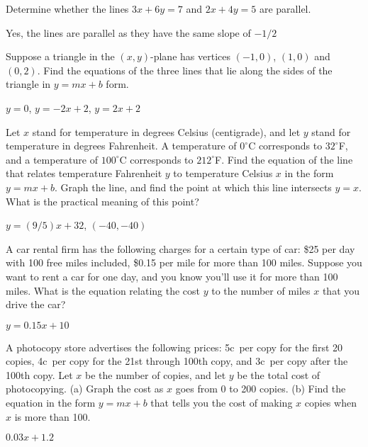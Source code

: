 \begin{enumialphparenastyle}
\begin{multicols}{2}
\begin{ex}
Determine whether the lines $3x+6y=7$ and $2x+4y=5$ are parallel.
\begin{sol}
Yes, the lines are parallel as they have the same slope of $-1/2$
\end{sol}
\end{ex}

\begin{ex}
Suppose a triangle in the $(x,y)$-plane has vertices $(-1,0)$,
$(1,0)$ and $(0,2)$.  Find the equations of the three lines that lie along
 the sides of the triangle in $y=mx+b$ form.
\begin{sol}
$y=0$, $y=-2x+2$, $y=2x+2$
\end{sol}
\end{ex}

\begin{ex}
Let $x$ stand for temperature in degrees Celsius (centigrade), and let
$y$ stand for temperature in degrees Fahrenheit.  A temperature of $0^\circ$C
corresponds to $32^\circ$F, and a temperature of
$100^\circ$C corresponds to $212^\circ$F.  Find the
equation of the line that relates temperature Fahrenheit $y$ to
temperature Celsius $x$ in the form $y=mx+b$.  
Graph the line, and find the point at which this line intersects $y=x$.
What is the practical meaning of this point?
\begin{sol}
$y=(9/5)x+32$, $(-40,-40)$
\end{sol}
\end{ex}

\begin{ex}
A car rental firm has the following charges for a certain type of car:
\$25 per day with 100 free miles included, \$0.15 per mile for more than
100 miles.  Suppose you want to rent a car for one day, and you know you'll
use it for more than 100 miles.  What is the equation relating the cost
$y$ to the number of miles $x$ that you drive the car?
\begin{sol}
$y=0.15x+10$
\end{sol}
\end{ex}

\begin{ex}
A photocopy store advertises the following prices: 5c~per
copy for the first 20 copies, 4c~per copy for the 21st through
100th copy, and 3c~per copy after the 100th copy.  Let $x$ be the
number of copies, and let $y$ be the total cost of photocopying.  (a)
Graph the cost as $x$ goes from 0 to 200 copies.  (b) Find the
equation in the form $y=mx+b$ that tells you the cost of making $x$
copies when $x$ is more than 100.
\begin{sol}
$0.03x+1.2$
\end{sol}
\end{ex}


\end{multicols}
\end{enumialphparenastyle}
